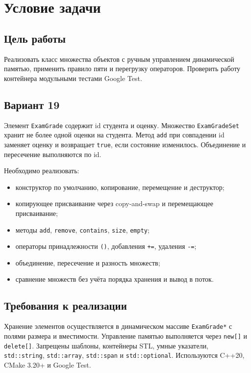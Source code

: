 \section{Условие задачи}

\subsection{Цель работы}

Реализовать класс множества объектов с ручным управлением динамической памятью, применить правило пяти и перегрузку операторов. Проверить работу контейнера модульными тестами Google Test.

\subsection{Вариант 19}

Элемент \texttt{ExamGrade} содержит id студента и оценку. Множество \texttt{ExamGradeSet} хранит не более одной оценки на студента. Метод \texttt{add} при совпадении id заменяет оценку и возвращает \texttt{true}, если состояние изменилось. Объединение и пересечение выполняются по id.

Необходимо реализовать:
\begin{itemize}
  \item конструктор по умолчанию, копирование, перемещение и деструктор;
  \item копирующее присваивание через copy-and-swap и перемещающее присваивание;
  \item методы \texttt{add}, \texttt{remove}, \texttt{contains}, \texttt{size}, \texttt{empty};
  \item операторы принадлежности \texttt{()}, добавления \texttt{+=}, удаления \texttt{-=};
  \item объединение, пересечение и разность множеств;
  \item сравнение множеств без учёта порядка хранения и вывод в поток.
\end{itemize}

\subsection{Требования к реализации}

Хранение элементов осуществляется в динамическом массиве \texttt{ExamGrade*} с полями размера и вместимости. Управление памятью выполняется через \texttt{new[]} и \texttt{delete[]}. Запрещены шаблоны, контейнеры STL, умные указатели, \texttt{std::string}, \texttt{std::array}, \texttt{std::span} и \texttt{std::optional}. Используются C++20, CMake 3.20+ и Google Test.
